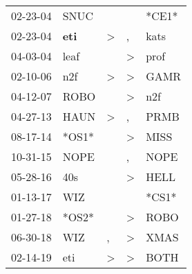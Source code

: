 \begin{supertabular}{p{0.07\textwidth}p{0.06\textwidth}p{0.02\textwidth}p{0.02\textwidth}p{0.06\textwidth}}
 02-23-04\textsuperscript{} &          SNUC\textsuperscript{} &               &               &                   *CE1* \\
 02-23-04\textsuperscript{} &  \textbf{eti\textsuperscript{}} &  \textgreater &             , &  kats\textsuperscript{} \\
 04-03-04\textsuperscript{} &          leaf\textsuperscript{} &               &  \textgreater &  prof\textsuperscript{} \\
 02-10-06\textsuperscript{} &           n2f\textsuperscript{} &  \textgreater &  \textgreater &  GAMR\textsuperscript{} \\
 04-12-07\textsuperscript{} &          ROBO\textsuperscript{} &               &  \textgreater &   n2f\textsuperscript{} \\
 04-27-13\textsuperscript{} &          HAUN\textsuperscript{} &  \textgreater &             , &  PRMB\textsuperscript{} \\
 08-17-14\textsuperscript{} &                           *OS1* &               &  \textgreater &  MISS\textsuperscript{} \\
 10-31-15\textsuperscript{} &          NOPE\textsuperscript{} &               &             , &  NOPE\textsuperscript{} \\
 05-28-16\textsuperscript{} &           40s\textsuperscript{} &               &  \textgreater &  HELL\textsuperscript{} \\
 01-13-17\textsuperscript{} &           WIZ\textsuperscript{} &               &               &                   *CS1* \\
 01-27-18\textsuperscript{} &                           *OS2* &               &  \textgreater &  ROBO\textsuperscript{} \\
 06-30-18\textsuperscript{} &           WIZ\textsuperscript{} &             , &  \textgreater &  XMAS\textsuperscript{} \\
 02-14-19\textsuperscript{} &           eti\textsuperscript{} &  \textgreater &  \textgreater &  BOTH\textsuperscript{} \\
\end{supertabular}
